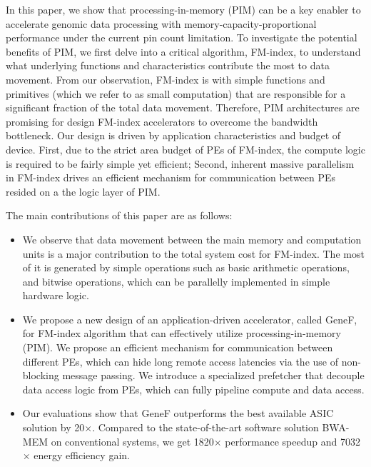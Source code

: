 \documentclass[9pt,conference]{IEEEtran}
\begin{document}
In this paper, we show that processing-in-memory (PIM) can be a key enabler to accelerate genomic data processing with memory-capacity-proportional performance under the current pin count limitation. 
To investigate the potential benefits of PIM, we first delve into a critical algorithm, FM-index, to understand what underlying functions and characteristics contribute the most to data movement. From our observation, FM-index is with simple functions and primitives (which we refer to as small computation) that are responsible for a significant fraction of the total data movement. Therefore, PIM architectures are promising for design FM-index accelerators to overcome the bandwidth bottleneck. Our design is driven by application characteristics and budget of device. First, due to the strict area budget of PEs of FM-index, the compute logic is required to be fairly simple yet efficient; Second, inherent massive parallelism in FM-index drives an efficient mechanism for communication between PEs resided on a the logic layer of PIM. 

The main contributions of this paper are as follows:

\begin{itemize}

    \item We observe that data movement between the main memory and computation units is a major contribution to the total system cost for FM-index. The most of it is generated by simple operations such as basic arithmetic operations, and bitwise operations, which can be parallelly implemented in simple hardware logic.
    
    \item We propose a new design of an application-driven accelerator, called GeneF, for FM-index algorithm that can effectively utilize processing-in-memory (PIM). We propose an efficient mechanism for communication between different PEs, which can hide long remote access latencies via the use of non-blocking message passing. We introduce a specialized prefetcher that decouple data access logic from PEs, which can fully pipeline compute and data access.
    
    \item Our evaluations show that GeneF outperforms the best available ASIC solution by 20$\times$. Compared to the state-of-the-art software solution BWA-MEM on conventional systems, we get 1820$\times$ performance speedup and 7032$\times$ energy efficiency gain.
    
\end{itemize}
\end{document}
